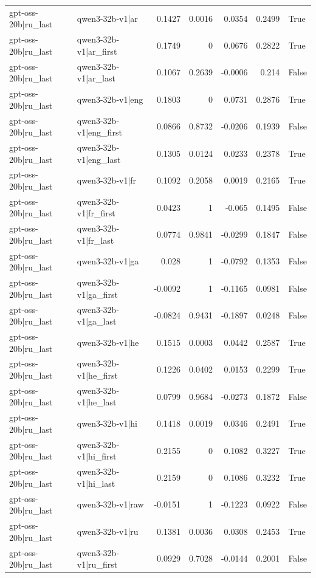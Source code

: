\begin{table}
\begin{tabular}{l l r r r r l}
gpt-oss-20b|ru_last & qwen3-32b-v1|ar & 0.1427 & 0.0016 & 0.0354 & 0.2499 & True \\
gpt-oss-20b|ru_last & qwen3-32b-v1|ar_first & 0.1749 & 0 & 0.0676 & 0.2822 & True \\
gpt-oss-20b|ru_last & qwen3-32b-v1|ar_last & 0.1067 & 0.2639 & -0.0006 & 0.214 & False \\
gpt-oss-20b|ru_last & qwen3-32b-v1|eng & 0.1803 & 0 & 0.0731 & 0.2876 & True \\
gpt-oss-20b|ru_last & qwen3-32b-v1|eng_first & 0.0866 & 0.8732 & -0.0206 & 0.1939 & False \\
gpt-oss-20b|ru_last & qwen3-32b-v1|eng_last & 0.1305 & 0.0124 & 0.0233 & 0.2378 & True \\
gpt-oss-20b|ru_last & qwen3-32b-v1|fr & 0.1092 & 0.2058 & 0.0019 & 0.2165 & True \\
gpt-oss-20b|ru_last & qwen3-32b-v1|fr_first & 0.0423 & 1 & -0.065 & 0.1495 & False \\
gpt-oss-20b|ru_last & qwen3-32b-v1|fr_last & 0.0774 & 0.9841 & -0.0299 & 0.1847 & False \\
gpt-oss-20b|ru_last & qwen3-32b-v1|ga & 0.028 & 1 & -0.0792 & 0.1353 & False \\
gpt-oss-20b|ru_last & qwen3-32b-v1|ga_first & -0.0092 & 1 & -0.1165 & 0.0981 & False \\
gpt-oss-20b|ru_last & qwen3-32b-v1|ga_last & -0.0824 & 0.9431 & -0.1897 & 0.0248 & False \\
gpt-oss-20b|ru_last & qwen3-32b-v1|he & 0.1515 & 0.0003 & 0.0442 & 0.2587 & True \\
gpt-oss-20b|ru_last & qwen3-32b-v1|he_first & 0.1226 & 0.0402 & 0.0153 & 0.2299 & True \\
gpt-oss-20b|ru_last & qwen3-32b-v1|he_last & 0.0799 & 0.9684 & -0.0273 & 0.1872 & False \\
gpt-oss-20b|ru_last & qwen3-32b-v1|hi & 0.1418 & 0.0019 & 0.0346 & 0.2491 & True \\
gpt-oss-20b|ru_last & qwen3-32b-v1|hi_first & 0.2155 & 0 & 0.1082 & 0.3227 & True \\
gpt-oss-20b|ru_last & qwen3-32b-v1|hi_last & 0.2159 & 0 & 0.1086 & 0.3232 & True \\
gpt-oss-20b|ru_last & qwen3-32b-v1|raw & -0.0151 & 1 & -0.1223 & 0.0922 & False \\
gpt-oss-20b|ru_last & qwen3-32b-v1|ru & 0.1381 & 0.0036 & 0.0308 & 0.2453 & True \\
gpt-oss-20b|ru_last & qwen3-32b-v1|ru_first & 0.0929 & 0.7028 & -0.0144 & 0.2001 & False \\

\end{tabular}
\end{table}
